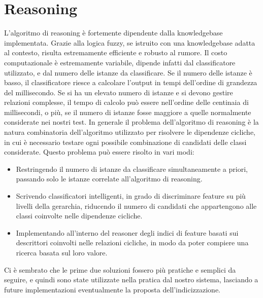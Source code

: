 \section{Reasoning}
L'algoritmo di reasoning è fortemente dipendente dalla knowledgebase implementata. Grazie alla logica fuzzy, se istruito con una knowledgebase adatta al contesto, risulta estremamente efficiente e robusto al rumore. Il costo computazionale è estremamente variabile, dipende infatti dal classificatore utilizzato, e dal numero delle istanze da classificare. Se il numero delle istanze è basso, il classificatore riesce a calcolare l'output in tempi dell'ordine di grandezza del millisecondo. Se si ha un elevato numero di istanze e si devono gestire relazioni complesse, il tempo di calcolo può essere nell'ordine delle centinaia di millisecondi, o più, se il numero di istanze fosse maggiore a quelle normalmente considerate nei nostri test. In generale il problema dell'algoritmo di reasoning è la natura combinatoria dell'algoritmo utilizzato per risolvere le dipendenze cicliche, in cui è necessario testare ogni possibile combinazione di candidati delle classi considerate. Questo problema può essere risolto in vari modi: 
\begin{itemize}
 \item Restringendo il numero di istanze da classificare simultaneamente a priori, passando solo le istanze correlate all'algoritmo di reasoning.
 \item Scrivendo classificatori intelligenti, in grado di discriminare feature su più livelli della gerarchia, riducendo il numero di candidati che appartengono alle classi coinvolte nelle dipendenze cicliche.
 \item Implementando all'interno del reasoner degli indici di feature basati sui descrittori coinvolti nelle relazioni cicliche, in modo da poter compiere una ricerca basata sul loro valore.
\end{itemize}
Ci è sembrato che le prime due soluzioni fossero più pratiche e semplici da seguire, e quindi sono state utilizzate nella pratica dal nostro sistema, lasciando a future implementazioni eventualmente la proposta dell'indicizzazione.

